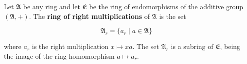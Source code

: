 Let $\mathfrak{A}$ be any ring and let $\mathfrak{E}$ be the ring of endomorphisms of the additive group $(\mathfrak{A}, +)$. The \textbf{ring of right multiplications} of $\mathfrak{A}$ is the set

$$\mathfrak{A}_r = \{a_r \mid a \in \mathfrak{A}\}$$

where $a_r$ is the right multiplication $x \mapsto xa$. The set $\mathfrak{A}_r$ is a subring of $\mathfrak{E}$, being the image of the ring homomorphism $a \mapsto a_r$.
